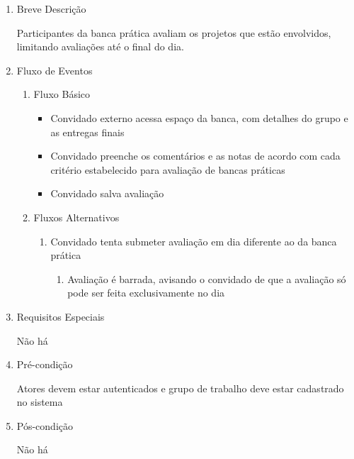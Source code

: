 \begin{enumerate}
    \item Breve Descrição


Participantes da banca prática avaliam os projetos que estão envolvidos, limitando avaliações até o final do dia.


    \item Fluxo de Eventos

\begin{enumerate}
    \item Fluxo Básico

\begin{itemize}
    \item Convidado externo acessa espaço da banca, com detalhes do grupo e as entregas finais

    \item Convidado preenche os comentários e as notas de acordo com cada critério estabelecido para avaliação de bancas práticas

    \item Convidado salva avaliação
\end{itemize}

    \item Fluxos Alternativos

\begin{enumerate}
    \item Convidado tenta submeter avaliação em dia diferente ao da banca prática

\begin{enumerate}
    \item Avaliação é barrada, avisando o convidado de que a avaliação só pode ser feita exclusivamente no dia



\end{enumerate}
\end{enumerate}
\end{enumerate}
    \item Requisitos Especiais


Não há


    \item Pré-condição


Atores devem estar autenticados e grupo de trabalho deve estar cadastrado no sistema


    \item Pós-condição

    Não há
\end{enumerate}
















